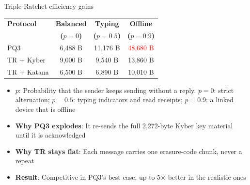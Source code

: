 \ifdefined\PRESENTATION\else\PassOptionsToClass{handout}{beamer}\fi\documentclass[aspectratio=169, lualatex]{beamer}
\begin{document}
\begin{frame}{Triple Ratchet efficiency gains}
	\begin{center}
		\begin{tabular}{|l|c|c|c|}
			\hline
			\textbf{Protocol} & \textbf{Balanced}                   & \textbf{Typing}                     & \textbf{Offline}                     \\
			                  & \textbf{($p=0$)}                    & \textbf{($p=0.5$)}                  & \textbf{($p=0.9$)}                   \\
			\hline
			PQ3               & 6,488 B                             & 11,176 B                            & \textcolor{red}{48,680 B}            \\
			TR + Kyber        & 9,000 B                             & 9,540 B                             & 13,860 B                             \\
			TR + Katana       & \textcolor{green!70!black}{6,500 B} & \textcolor{green!70!black}{6,890 B} & \textcolor{green!70!black}{10,010 B} \\
			\hline
		\end{tabular}
	\end{center}
	\begin{itemize}
		\item \textbf{$p$}: Probability that the sender keeps sending without a reply. $p = 0$: strict alternation; $p = 0.5$: typing indicators and read receipts; $p = 0.9$: a linked device that is offline
		\item \textbf{Why PQ3 explodes}: It re-sends the full 2,272-byte Kyber key material until it is acknowledged
		\item \textbf{Why TR stays flat}: Each message carries one erasure-code chunk, never a repeat
		\item \textbf{Result}: Competitive in PQ3's best case, up to 5$\times$ better in the realistic ones
	\end{itemize}
\end{frame}
\end{document}
